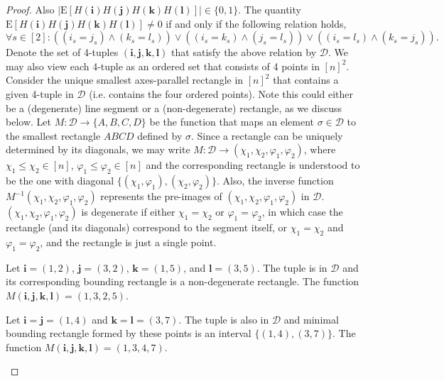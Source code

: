 \def\draft{0}  \documentclass[proceedings]{stacs}
\theoremstyle{plain}\newtheorem{satz}[thm]{Satz}
\theoremstyle{definition}\newtheorem{crucial}[thm]{Crucial Definition}
\begin{document}
\begin{proof}
Also $\left|\mathrm E[H(\mathbf i)H(\mathbf j)H(\mathbf k)H(\mathbf l)]\right| \in \{0, 1\}$. The quantity
$\mathrm E[H(\mathbf i)H(\mathbf j)H(\mathbf k)H(\mathbf l)] \neq 0$ if and only if the following relation holds,
\begin{equation}\label{eqn:relation}
\forall s \in [2]: \left( (i_s = j_s) \wedge (k_s = l_s) \right) \vee \left( (i_s = k_s) \wedge (j_s = l_s) \right) \vee \left( (i_s = l_s) \wedge (k_s = j_s) \right).
\end{equation}
Denote the set of 4-tuples $(\mathbf i, \mathbf j, \mathbf k, \mathbf l)$ that satisfy the above relation by $\mathcal D$.
We may also view each 4-tuple as an ordered set that consists of 4 points in $[n]^2$.
Consider the unique smallest axes-parallel rectangle in $[n]^2$
that contains a given 4-tuple in $\mathcal D$ (i.e. contains the
four ordered points).  Note this could either be a (degenerate) line segment
or a (non-degenerate) rectangle, as we discuss below.
Let $M: \mathcal D \rightarrow \{A, B, C, D\}$ be the function
that maps an element $\sigma \in \mathcal D$ to the smallest rectangle
$ABCD$ defined by $\sigma$. Since a
rectangle can be uniquely determined by its diagonals, we may write
$M: \mathcal D \rightarrow (\chi_1, \chi_2, \varphi_1, \varphi_2)$,
where $\chi_1 \leq \chi_2 \in [n]$, $\varphi_1 \leq \varphi_2 \in [n]$
and the corresponding rectangle is understood to be the one with
diagonal $\{(\chi_1, \varphi_1), (\chi_2, \varphi_2)\}$. Also, the
inverse function $M^{-1}(\chi_1, \chi_2, \varphi_1, \varphi_2)$
represents the pre-images of $(\chi_1, \chi_2, \varphi_1, \varphi_2)$
in $\mathcal D$. $(\chi_1, \chi_2, \varphi_1, \varphi_2)$ is degenerate if either $\chi_1 =
\chi_2$ or $\varphi_1 = \varphi_2$, in which case the rectangle (and
its diagonals) correspond to the segment itself, or $\chi_1 =
\chi_2$ and $\varphi_1 = \varphi_2$, and the rectangle is just a
single point.


\begin{example}
Let $\mathbf i = (1, 2)$, $\mathbf j = (3, 2)$,
$\mathbf k = (1, 5)$, and $\mathbf l = (3, 5)$. The tuple is in $\mathcal D$ and its corresponding bounding rectangle is
a non-degenerate rectangle. The function $M(\mathbf i, \mathbf j, \mathbf k, \mathbf l) = (1, 3, 2, 5)$.
\end{example}

\begin{example} Let $\mathbf i = \mathbf j = (1, 4)$
and $\mathbf k = \mathbf l = (3, 7)$. The tuple is also in $\mathcal D$ and
minimal bounding rectangle formed by these points is an interval $\{(1, 4), (3, 7)\}$. The function
$M(\mathbf i, \mathbf j, \mathbf k, \mathbf l) = (1, 3, 4, 7)$.
\end{example}


\end{proof}
\end{document}

